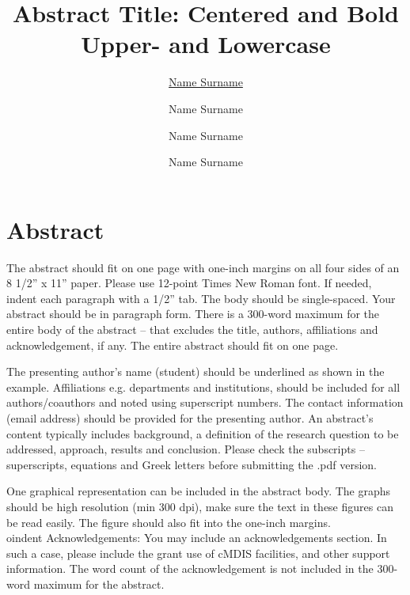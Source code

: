 \documentclass[12pt]{article}
\title{Abstract Title: Centered and Bold Upper- and Lowercase}
\author[1]{\underline{Name Surname}}
\author[2]{Name Surname}
\author[1,2]{Name Surname}
\author[1,3]{Name Surname}
\affil[1]{Department, Research Institute/University, City, Postal Code}
\affil[2]{Department, Research Institute/University, City, Postal Code}
\affil[3]{Department, Research Institute/University, City, Postal Code}
\begin{document}
\maketitle
\section*{\centering\large Abstract}
The abstract should fit on one page with one-inch margins on all four sides of an 8 1/2” x 11” paper. Please use 12-point Times New Roman font. If needed, indent each paragraph with a  1/2” tab. The body should be single-spaced. Your abstract should be in paragraph form. There is a 300-word maximum for the entire body of the abstract -- that excludes the title, authors, affiliations and acknowledgement, if any. The entire abstract should fit on one page. 

The presenting author’s name (student) should be underlined as shown in the example. Affiliations e.g. departments and institutions, should be included for all authors/coauthors and noted using superscript numbers. The contact information (email address) should be provided for the presenting author. 
An abstract’s content typically includes background, a definition of the research question to be addressed, approach, results and conclusion. Please check the subscripts -- superscripts, equations and Greek letters before submitting the .pdf version.

One graphical representation can be included in the abstract body. The graphs should be high resolution (min 300 dpi), make sure the text in these figures can be read easily. The figure should also fit into the one-inch margins.\\


oindent Acknowledgements: You may include an acknowledgements section. In such a case, please include the grant use of cMDIS facilities, and other support information. The word count of the acknowledgement is not included in the 300-word maximum for the abstract.
\end{document}
